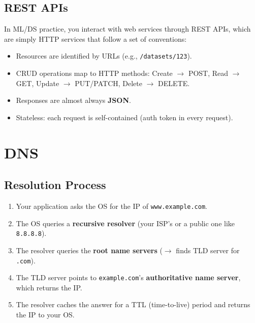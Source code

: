 \documentclass[oneside]{book}
\begin{document}
\subsection*{REST APIs}

In ML/DS practice, you interact with web services through REST APIs, which are
simply HTTP services that follow a set of conventions:
\begin{itemize}
    \item Resources are identified by URLs (e.g., \texttt{/datasets/123}).
    \item CRUD operations map to HTTP methods: Create $\to$ POST, Read $\to$ GET,
          Update $\to$ PUT/PATCH, Delete $\to$ DELETE.
    \item Responses are almost always \textbf{JSON}.
    \item Stateless: each request is self-contained (auth token in every request).
\end{itemize}

\section{DNS}


\subsection*{Resolution Process}

\begin{enumerate}
    \item Your application asks the OS for the IP of \texttt{www.example.com}.
    \item The OS queries a \textbf{recursive resolver} (your ISP's or a public one
          like \texttt{8.8.8.8}).
    \item The resolver queries the \textbf{root name servers} ($\to$ finds TLD server
          for \texttt{.com}).
    \item The TLD server points to \texttt{example.com}'s \textbf{authoritative name
          server}, which returns the IP.
    \item The resolver caches the answer for a TTL (time-to-live) period and returns
          the IP to your OS.
\end{enumerate}
\end{document}
